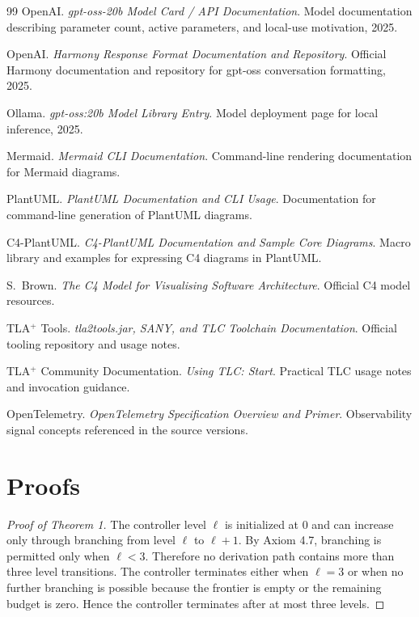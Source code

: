 \documentclass[11pt,a4paper]{article}
\numberwithin{equation}{section}
\theoremstyle{definition}
\begin{document}
\begin{thebibliography}{99}
OpenAI.
\newblock \emph{gpt-oss-20b Model Card / API Documentation}.
\newblock Model documentation describing parameter count, active parameters, and local-use motivation, 2025.

OpenAI.
\newblock \emph{Harmony Response Format Documentation and Repository}.
\newblock Official Harmony documentation and repository for gpt-oss conversation formatting, 2025.

Ollama.
\newblock \emph{gpt-oss:20b Model Library Entry}.
\newblock Model deployment page for local inference, 2025.

Mermaid.
\newblock \emph{Mermaid CLI Documentation}.
\newblock Command-line rendering documentation for Mermaid diagrams.

PlantUML.
\newblock \emph{PlantUML Documentation and CLI Usage}.
\newblock Documentation for command-line generation of PlantUML diagrams.

C4-PlantUML.
\newblock \emph{C4-PlantUML Documentation and Sample Core Diagrams}.
\newblock Macro library and examples for expressing C4 diagrams in PlantUML.

S.~Brown.
\newblock \emph{The C4 Model for Visualising Software Architecture}.
\newblock Official C4 model resources.

TLA\(^+\) Tools.
\newblock \emph{tla2tools.jar, SANY, and TLC Toolchain Documentation}.
\newblock Official tooling repository and usage notes.

TLA\(^+\) Community Documentation.
\newblock \emph{Using TLC: Start}.
\newblock Practical TLC usage notes and invocation guidance.

OpenTelemetry.
\newblock \emph{OpenTelemetry Specification Overview and Primer}.
\newblock Observability signal concepts referenced in the source versions.

\end{thebibliography}

\appendix

\section{Proofs}
\label{app:proofs}

\begin{proof}[Proof of Theorem 1]
The controller level \(\ell\) is initialized at \(0\) and can increase only through branching from level \(\ell\) to \(\ell+1\). By Axiom 4.7, branching is permitted only when \(\ell<3\). Therefore no derivation path contains more than three level transitions. The controller terminates either when \(\ell=3\) or when no further branching is possible because the frontier is empty or the remaining budget is zero. Hence the controller terminates after at most three levels.
\end{proof}
\end{document}
